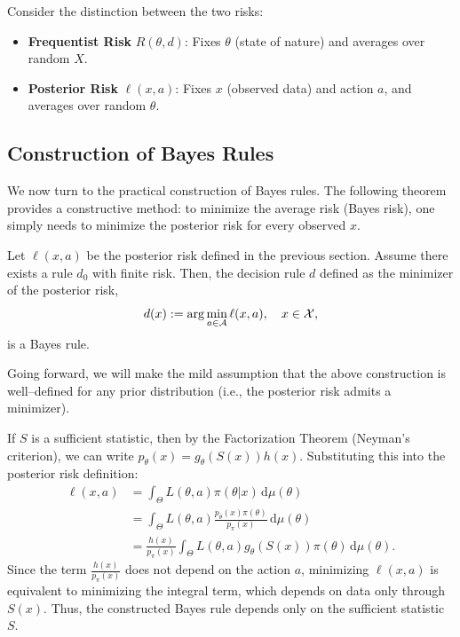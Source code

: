 \medskip

    Consider the distinction between the two risks:
    \begin{itemize}
        \item \textbf{Frequentist Risk} \(R(\theta, d)\): Fixes \(\theta\) (state of nature) and averages over random \(X\).
        \item \textbf{Posterior Risk} \(\ell(x, a)\): Fixes \(x\) (observed data) and action \(a\), and averages over random \(\theta\).
    \end{itemize}

\subsection{Construction of Bayes Rules}
\label{subsec:construction_bayes}

We now turn to the practical construction of Bayes rules. The following theorem provides a constructive method: to minimize the average risk (Bayes risk), one simply needs to minimize the posterior risk for every observed \(x\).

\begin{theo}
\label{thm:bayes_construction}
Let \(\ell(x, a)\) be the posterior risk defined in the previous section. Assume there exists a rule \(d_0\) with finite risk. Then, the decision rule \(d\) defined as the minimizer of the posterior risk,
\[
d(x) := \arg\min_{a \in \mathcal{A}} \ell(x, a), \quad x \in \mathcal{X},
\]
is a Bayes rule.
\end{theo}

Going forward, we will make the mild assumption that the above construction is well--defined for any prior distribution (i.e., the posterior risk admits a minimizer).

\begin{remark}
    If \(S\) is a sufficient statistic, then by the Factorization Theorem (Neyman's criterion), we can write \(p_{\theta}(x) = g_{\theta}(S(x))h(x)\). Substituting this into the posterior risk definition:
    \[
    \begin{split} 
    \ell(x,a) &= \int_{\Theta} L(\theta,a) \pi(\theta|x) \, \mathrm{d}\mu(\theta) \\ 
    &= \int_{\Theta} L(\theta,a) \frac{p_{\theta}(x) \pi(\theta)}{p_{\pi}(x)} \, \mathrm{d}\mu(\theta) \\ 
    &= \frac{h(x)}{p_{\pi}(x)} \int_{\Theta} L(\theta,a) g_{\theta}(S(x)) \pi(\theta) \, \mathrm{d}\mu(\theta). 
    \end{split}
    \]
    Since the term \(\frac{h(x)}{p_{\pi}(x)}\) does not depend on the action \(a\), minimizing \(\ell(x,a)\) is equivalent to minimizing the integral term, which depends on data only through \(S(x)\). Thus, the constructed Bayes rule depends only on the sufficient statistic \(S\).
\end{remark}


